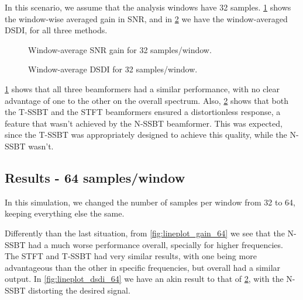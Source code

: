 In this scenario, we assume that the analysis windows have 32 samples. \cref{fig:lineplot_gain_32} shows the window-wise averaged gain in SNR, and in \cref{fig:lineplot_dsdi_32} we have the window-averaged DSDI, for all three methods.



%	
%	
%
\begin{figure}[H]
\centering

\caption{Window-average SNR gain for 32 samples/window.}
\label{fig:lineplot_gain_32}
\end{figure}

\begin{figure}[H]
	\centering
	
	\caption{Window-average DSDI for 32 samples/window.}
	\label{fig:lineplot_dsdi_32}
\end{figure}

\cref{fig:lineplot_gain_32} shows that all three beamformers had a similar performance, with no clear advantage of one to the other on the overall spectrum. Also, \cref{fig:lineplot_dsdi_32} shows that both the T-SSBT and the STFT beamformers ensured a distortionless response, a feature that wasn't achieved by the N-SSBT beamformer. This was expected, since the T-SSBT was appropriately designed to achieve this quality, while the N-SSBT wasn't.
%
\subsection{Results - 64 samples/window}

In this simulation, we changed the number of samples per window from 32 to 64, keeping everything else the same.

Differently than the last situation, from \cref{fig:lineplot_gain_64} we see that the N-SSBT had a much worse performance overall, specially for higher frequencies. The STFT and T-SSBT had very similar results, with one being more advantageous than the other in specific frequencies, but overall had a similar output. In \cref{fig:lineplot_dsdi_64} we have an akin result to that of \cref{fig:lineplot_dsdi_32}, with the N-SSBT distorting the desired signal.


